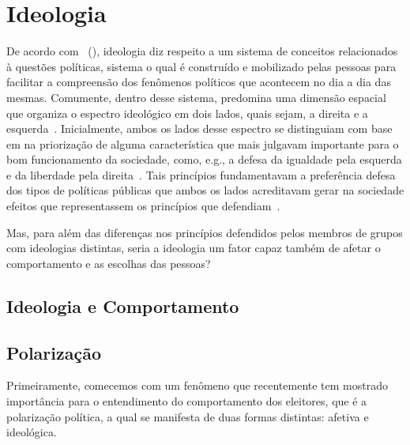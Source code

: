 \documentclass[
	12pt,				%
	openright,			%
	twoside,			%
	a4paper,			%
	openany,
	english,			%
	brazil				%
	]{abntex2}
\begin{document}
\section{Ideologia}

De acordo com ~(\citeyear{freeden1998ideologies}), ideologia diz respeito a um sistema de conceitos relacionados à questões políticas, sistema o qual é construído e mobilizado pelas pessoas para facilitar a compreensão dos fenômenos políticos que acontecem no dia a dia das mesmas. Comumente, dentro desse sistema, predomina uma dimensão espacial que organiza o espectro ideológico em dois lados, quais sejam, a direita e a esquerda~\cite{inglehart20172}. Inicialmente, ambos os lados desse espectro se distinguiam com base em na priorização de alguma característica que mais julgavam importante para o bom funcionamento da sociedade, como, e.g., a defesa da igualdade pela esquerda e da liberdade pela direita~\cite{bobbio2001direita}. Tais princípios fundamentavam a preferência defesa dos tipos de políticas públicas que ambos os lados acreditavam gerar na sociedade efeitos que representassem os princípios que defendiam~\cite{bobbio2001direita}.

Mas, para além das diferenças nos princípios defendidos pelos membros de grupos com ideologias distintas, seria a ideologia um fator capaz também de afetar o comportamento e as escolhas das pessoas?

\subsection{Ideologia e Comportamento}

\subsection{Polarização}


Primeiramente, comecemos com um fenômeno que recentemente tem mostrado importância para o entendimento do comportamento dos eleitores, que é a polarização política, a qual se manifesta de duas formas distintas: afetiva e ideológica\cite{Bednar2021Dec, Baldassarri2021Dec, Axelrod2021Dec}.
\end{document}
